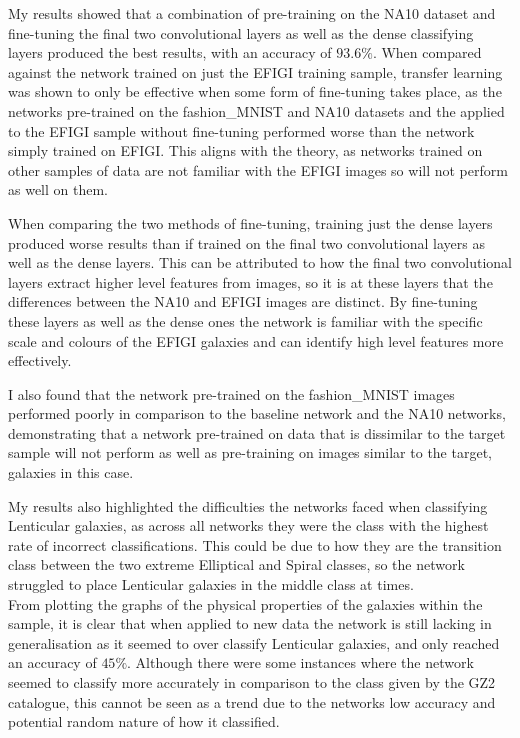 \documentclass[12pt, onecolumn]{aa}
\begin{document}
My results showed that a combination of pre-training on the NA10 dataset and fine-tuning the final two convolutional layers as well as the dense classifying layers produced the best results, with an accuracy of $93.6\%$. When compared against the network trained on just the EFIGI training sample, transfer learning was shown to only be effective when some form of fine-tuning takes place, as the networks pre-trained on the fashion\_MNIST and NA10 datasets and the applied to the EFIGI sample without fine-tuning performed worse than the network simply trained on EFIGI. This aligns with the theory, as networks trained on other samples of data are not familiar with the EFIGI images so will not perform as well on them.

When comparing the two methods of fine-tuning, training just the dense layers produced worse results than if trained on the final two convolutional layers as well as the dense layers. This can be attributed to how the final two convolutional layers extract higher level features from images, so it is at these layers that the differences between the NA10 and EFIGI images are distinct. By fine-tuning these layers as well as the dense ones the network is familiar with the specific scale and colours of the EFIGI galaxies and can identify high level features more effectively. 

I also found that the network pre-trained on the fashion\_MNIST images performed poorly in comparison to the baseline network and the NA10 networks, demonstrating that a network pre-trained on data that is dissimilar to the target sample will not perform as well as pre-training on images similar to the target, galaxies in this case.

My results also highlighted the difficulties the networks faced when classifying Lenticular galaxies, as across all networks they were the class with the highest rate of incorrect classifications. This could be due to how they are the transition class between the two extreme Elliptical and Spiral classes, so the network struggled to place Lenticular galaxies in the middle class at times. \\

From plotting the graphs of the physical properties of the galaxies within the sample, it is clear that when applied to new data the network is still lacking in generalisation as it seemed to over classify Lenticular galaxies, and only reached an accuracy of $45\%$. Although there were some instances where the network seemed to classify more accurately in comparison to the class given by the GZ2 catalogue, this cannot be seen as a trend due to the networks low accuracy and potential random nature of how it classified.
\end{document}
